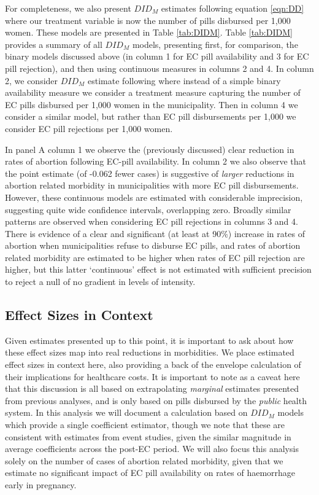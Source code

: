 \documentclass[12pt]{article}
\begin{document}
\begin{spacing}{1.9}
For completeness, we also present $DID_M$ estimates following equation \ref{eqn:DD} where our treatment variable is now the number of pills disbursed per 1,000 women.  These models are presented in Table \ref{tab:DIDM}.  Table \ref{tab:DIDM} provides a summary of all $DID_M$ models, presenting first, for comparison, the binary models discussed above (in column 1 for EC pill availability and 3 for EC pill rejection), and then using continuous measures in columns 2 and 4.  In column 2, we consider $DID_M$ estimate following \citet{ChaisemartinDH2019} where instead of a simple binary availability measure we consider a treatment measure capturing the number of EC pills disbursed per 1,000 women in the municipality.  Then in column 4 we consider a similar model, but rather than EC pill disbursements per 1,000 we consider EC pill rejections per 1,000 women.  

In panel A column 1 we observe the (previously discussed) clear reduction in rates of abortion following EC-pill availability.  In column 2 we also observe that the point estimate (of -0.062 fewer cases) is suggestive of \emph{larger} reductions in abortion related morbidity in municipalities with more EC pill disbursements.  However, these continuous models are estimated with considerable imprecision, suggesting quite wide confidence intervals, overlapping zero.  Broadly similar patterns are observed when considering EC pill rejections in columns 3 and 4.  There is evidence of a clear and significant (at least at 90\%) increase in rates of abortion when municipalities refuse to disburse EC pills, and rates of abortion related morbidity are estimated to be higher when rates of EC pill rejection are higher, but this latter `continuous' effect is not estimated with sufficient precision to reject a null of no gradient in levels of intensity.





\subsection{Effect Sizes in Context}
\label{sscn:effectsize}
Given estimates presented up to this point, it is important to ask about how these effect sizes map into real reductions in morbidities. 
We place estimated effect sizes in context here, also providing a back of the envelope calculation of their implications for healthcare costs.  It is important to note as a caveat here that this discussion is all based on extrapolating \emph{marginal} estimates presented from previous analyses, and is only based on pills disbursed by the \emph{public} health system.  In this analysis we will document a calculation based on $DID_M$ models which provide a single coefficient estimator, though we note that these are consistent with estimates from event studies, given the similar magnitude in average coefficients across the post-EC period.  We will also focus this analysis solely on the number of cases of abortion related morbidity, given that we estimate no significant impact of EC pill availability on rates of haemorrhage early in pregnancy.  


\end{spacing}
\end{document}
